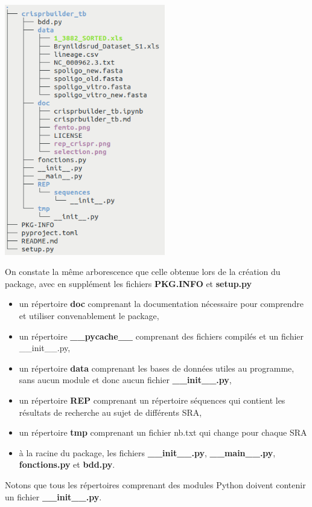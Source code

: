 \documentclass[twoside,a4paper,11pt,frenchb,openany]{report}
\begin{document}
\includegraphics[width=7cm]{tar.png}

On constate la même arborescence que celle obtenue lors de la création du package, avec en supplément les fichiers \textbf{PKG.INFO} et \textbf{setup.py}

\begin{itemize}
\item un répertoire \textbf{doc} comprenant la documentation nécessaire pour comprendre et utiliser convenablement le package,
\item un répertoire \textbf{\_\_pycache\_\_} comprenant des fichiers compilés et un fichier \_\_init\_\_.py,
\item un répertoire \textbf{data} comprenant les bases de données utiles au programme, sans aucun module et donc aucun fichier \textbf{\_\_init\_\_.py},
\item un répertoire \textbf{REP} comprenant un répertoire séquences qui contient les résultats de recherche au sujet de différents SRA,
\item un répertoire \textbf{tmp} comprenant un fichier nb.txt qui change pour chaque SRA
\item à la racine du package, les fichiers \textbf{\_\_init\_\_.py}, \textbf{\_\_main\_\_.py}, \textbf{fonctions.py} et \textbf{bdd.py}.
\end{itemize}

Notons que tous les répertoires comprenant des modules Python doivent contenir un fichier
\textbf{ \_\_init\_\_.py}.
\end{document}
